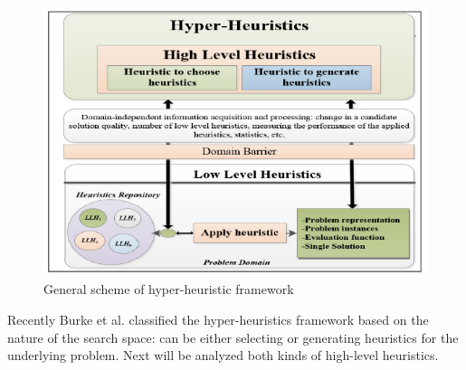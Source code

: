 \documentclass[conference]{IEEEtran}
\begin{document}
 
\begin{figure}[htb!] \label{fig:HyperHeuristics}
	\centering
	\includegraphics[scale=0.6]{figures/hyperheuristic.png}
	\caption{General scheme of hyper-heuristic framework}
\end{figure}	




Recently Burke et al. \cite{burke2010classification} classified the hyper-heuristics framework based on the nature of the search space: can be either selecting or generating heuristics for the underlying problem. Next will be analyzed both kinds of high-level heuristics.
\end{document}

